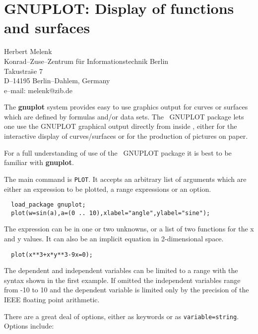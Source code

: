 \chapter[GNUPLOT: Plotting Functions]%
{GNUPLOT: Display of functions and surfaces}
\label{GNUPLOT}

{\footnotesize
\begin{center}
Herbert Melenk \\
Konrad--Zuse--Zentrum f\"ur Informationstechnik Berlin \\
Takustra\"se 7 \\
D--14195 Berlin--Dahlem, Germany \\[0.05in]
e--mail: melenk@zib.de
\end{center}
}

The {\bf gnuplot} system provides easy to use graphics output for
curves or surfaces which are defined by formulas and/or data sets.
The \REDUCE\ GNUPLOT package lets one use the GNUPLOT graphical output
directly from inside \REDUCE, either for the interactive display of
curves/surfaces or for the production of pictures on paper.

For a full understanding of use of the \REDUCE\ GNUPLOT package it is
best to be familiar with {\bf gnuplot}.

The main command is {\tt PLOT}.  It accepts an arbitrary
list of arguments which are either an expression to be plotted, a
range expressions or an option.

\begin{verbatim}
  load_package gnuplot;
  plot(w=sin(a),a=(0 .. 10),xlabel="angle",ylabel="sine");
\end{verbatim}

The expression can be in one or two unknowns, or a list of two
functions for the x and y values.  It can also be an implicit equation
in 2-dimensional space.

\begin{verbatim}
  plot(x**3+x*y**3-9x=0);
\end{verbatim}

The dependent and independent variables can be limited to a range with
the syntax shown in the first example.  If omitted the independent
variables range from -10 to 10 and the dependent variable is limited
only by the precision of the IEEE floating point arithmetic.

There are a great deal of options, either as keywords or as
{\tt variable=string}. Options include:

